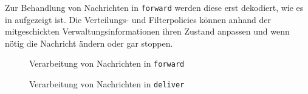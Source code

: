 Zur Behandlung von Nachrichten in \texttt{forward} werden diese erst dekodiert, wie es in  aufgezeigt ist. Die Verteilungs- und Filterpolicies können anhand der mitgeschickten Verwaltungsinformationen ihren Zustand anpassen und wenn nötig die Nachricht ändern oder gar stoppen.

\begin{figure}[htbp]
\centering
{}
\caption{Verarbeitung von Nachrichten in \texttt{forward}}
\label{fig:processing_forward}
\end{figure}

\begin{figure}[htbp]
\centering
{}
\caption{Verarbeitung von Nachrichten in \texttt{deliver}}
\label{fig:processing_deliver}
\end{figure}

